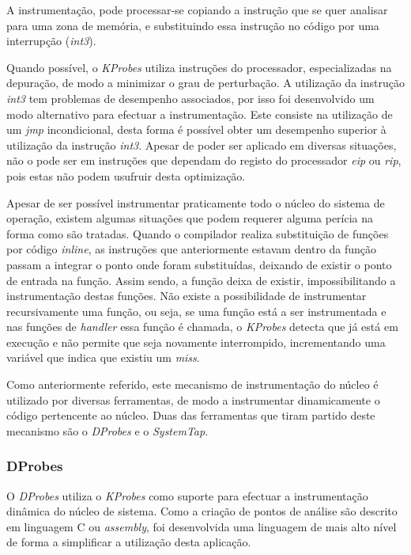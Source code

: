 A instrumentação, pode processar-se copiando a instrução que se quer analisar para uma zona de memória, e substituindo essa instrução no código por uma interrupção (\textit{int3}).

Quando possível, o \textit{KProbes} utiliza instruções do processador, especializadas na depuração, de modo a minimizar o grau de perturbação.
A utilização da instrução \textit{int3} tem problemas de desempenho associados, por isso foi desenvolvido um modo alternativo para efectuar a instrumentação.
Este consiste na utilização de um \textit{jmp} incondicional, desta forma é possível obter um desempenho superior à utilização da instrução \textit{int3}.
Apesar de poder ser aplicado em diversas situações, não o pode ser em instruções que dependam do registo do processador \textit{eip} ou \textit{rip}, pois estas não podem usufruir desta optimização.

Apesar de ser possível instrumentar praticamente todo o núcleo do sistema de operação, existem algumas situações que podem requerer alguma perícia na forma como são tratadas.
Quando o compilador realiza substituição de funções por código \textit{inline}, as instruções que anteriormente estavam dentro da função passam a integrar o ponto onde foram substituídas, deixando de existir o ponto de entrada na função.
Assim sendo, a função deixa de existir, impossibilitando a instrumentação destas funções.
Não existe a possibilidade de instrumentar recursivamente uma função, ou seja, se uma função está a ser instrumentada e nas funções de \textit{handler} essa função é chamada, o \textit{KProbes} detecta que já está em execução e não permite que seja novamente interrompido, incrementando uma variável que indica que existiu um \textit{miss}.

Como anteriormente referido, este mecanismo de instrumentação do núcleo é utilizado por diversas ferramentas, de modo a instrumentar dinamicamente o código pertencente ao núcleo.
Duas das ferramentas que tiram partido deste mecanismo são o \textit{DProbes} e o \textit{SystemTap}.

\subsubsection{DProbes}
O \textit{DProbes} utiliza o \textit{KProbes} como suporte para efectuar a instrumentação dinâmica do núcleo de sistema.
Como a criação de pontos de análise são descrito em linguagem C ou \textit{assembly}, foi desenvolvida uma linguagem de mais alto nível de forma a simplificar a utilização desta aplicação.

